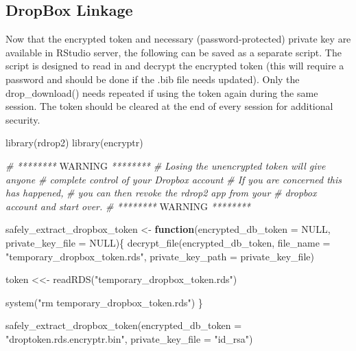 \documentclass[
]{book}
\newenvironment{Shaded}{\begin{snugshade}}{\end{snugshade}}
\newcommand{\AlertTok}[1]{\textcolor[rgb]{0.94,0.16,0.16}{#1}}
\newcommand{\AttributeTok}[1]{\textcolor[rgb]{0.77,0.63,0.00}{#1}}
\newcommand{\CommentTok}[1]{\textcolor[rgb]{0.56,0.35,0.01}{\textit{#1}}}
\newcommand{\ConstantTok}[1]{\textcolor[rgb]{0.00,0.00,0.00}{#1}}
\newcommand{\ControlFlowTok}[1]{\textcolor[rgb]{0.13,0.29,0.53}{\textbf{#1}}}
\newcommand{\FunctionTok}[1]{\textcolor[rgb]{0.00,0.00,0.00}{#1}}
\newcommand{\NormalTok}[1]{#1}
\newcommand{\OtherTok}[1]{\textcolor[rgb]{0.56,0.35,0.01}{#1}}
\newcommand{\StringTok}[1]{\textcolor[rgb]{0.31,0.60,0.02}{#1}}
\begin{document}
\hypertarget{dropbox-linkage}{%
\subsection{DropBox Linkage}\label{dropbox-linkage}}

Now that the encrypted token and necessary (password-protected) private key are available in RStudio server, the following can be saved as a separate script. The script is designed to read in and decrypt the encrypted token (this will require a password and should be done if the .bib file needs updated). Only the drop\_download() needs repeated if using the token again during the same session. The token should be cleared at the end of every session for additional security.

\begin{Shaded}
\begin{Highlighting}[]
\FunctionTok{library}\NormalTok{(rdrop2)}
\FunctionTok{library}\NormalTok{(encryptr)}
 
\CommentTok{\# ******** }\AlertTok{WARNING}\CommentTok{ ********}
\CommentTok{\# Losing the unencrypted token will give anyone }
\CommentTok{\# complete control of your Dropbox account}
\CommentTok{\# If you are concerned this has happened,}
\CommentTok{\# you can then revoke the rdrop2 app from your}
\CommentTok{\# dropbox account and start over.}
\CommentTok{\# ******** }\AlertTok{WARNING}\CommentTok{ ********}
 
 
\NormalTok{safely\_extract\_dropbox\_token }\OtherTok{\textless{}{-}} \ControlFlowTok{function}\NormalTok{(}\AttributeTok{encrypted\_db\_token =} \ConstantTok{NULL}\NormalTok{, }
                                         \AttributeTok{private\_key\_file =} \ConstantTok{NULL}\NormalTok{)\{}
  \FunctionTok{decrypt\_file}\NormalTok{(encrypted\_db\_token, }
               \AttributeTok{file\_name =} \StringTok{"temporary\_dropbox\_token.rds"}\NormalTok{, }
               \AttributeTok{private\_key\_path =}\NormalTok{ private\_key\_file)}
  
\NormalTok{  token }\OtherTok{\textless{}\textless{}{-}} \FunctionTok{readRDS}\NormalTok{(}\StringTok{"temporary\_dropbox\_token.rds"}\NormalTok{)}
  
  \FunctionTok{system}\NormalTok{(}\StringTok{"rm temporary\_dropbox\_token.rds"}\NormalTok{)}
\NormalTok{\}}
 
\FunctionTok{safely\_extract\_dropbox\_token}\NormalTok{(}\AttributeTok{encrypted\_db\_token =} \StringTok{"droptoken.rds.encryptr.bin"}\NormalTok{, }
                             \AttributeTok{private\_key\_file =} \StringTok{"id\_rsa"}\NormalTok{)}
 

\end{Highlighting}
\end{Shaded}
\end{document}
